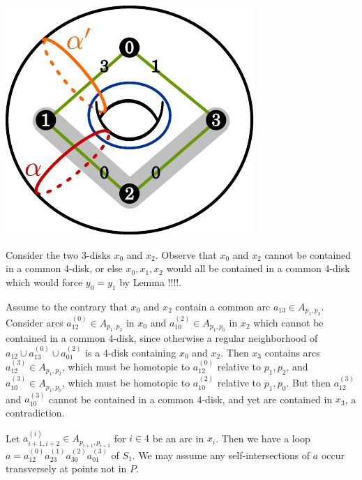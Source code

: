 \documentclass[11pt]{article}
\theoremstyle{remark}
\theoremstyle{definition}
\begin{document}
\includegraphics[width=.5\textwidth]{figures/nobigonsrotycase.pdf}

Consider the two 3-disks
$x_0$ and $x_2$. Observe that $x_0$ and $x_2$ cannot be contained in
a common 4-disk, or else $x_0,x_1,x_2$ would all be contained in a common
4-disk which would force $y_0=y_1$ by Lemma !!!!.

Assume to the contrary that $x_0$ and $x_2$
contain a common arc $a_{13} \in A_{p_1,p_3}$.
Consider arcs $a^{(0)}_{12} \in A_{p_1,p_2}$ in $x_0$
and $a^{(2)}_{10} \in A_{p_1,p_0}$ in $x_2$
which cannot be contained in a common 4-disk,
since otherwise a regular neighborhood of $a_{12} \cup a^{(0)}_{13} \cup a^{(2)}_{01}$
is a 4-disk containing $x_0$ and $x_2$.
Then $x_3$ contains arcs
$a^{(3)}_{12} \in A_{p_1,p_2}$,
which must be homotopic to $a^{(0)}_{12}$ relative to $p_1,p_2$,
and
$a^{(3)}_{10} \in A_{p_1,p_0}$,
which must be homotopic to $a^{(2)}_{10}$ relative to $p_1,p_0$.
But then $a^{(3)}_{12}$ and $a^{(3)}_{10}$
cannot be contained in a common 4-disk, and yet are contained in $x_3$, a contradiction.

Let $a^{(i)}_{i+1,i+2} \in A_{p_{i+1}, p_{i+2}}$ for $i \in 4$
be an arc in $x_{i}$.
Then we have a
loop $a=a^{(0)}_{12}a^{(1)}_{23}a^{(2)}_{30}a^{(3)}_{01}$
of $S_1$.
We may assume any self-intersections of $a$ occur
transversely at points not in $P$.
\end{document}
